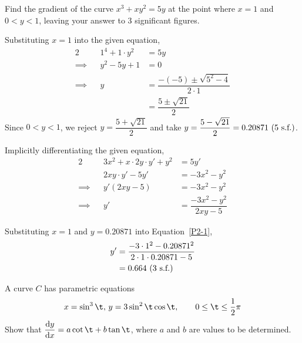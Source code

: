 \documentclass{echw}
\begin{document}
    \problem{}
        Find the gradient of the curve $x^3 + xy^2 = 5y$ at the point where $x=1$ and $0 < y < 1$, leaving your answer to 3 significant figures.

    \solution
        Substituting $x=1$ into the given equation,
        \begin{alignat*}{2}
            &&1^4 + 1\cdot y^2 &= 5y\\
            \implies&&y^2-5y+1&=0\\
            \implies&&y &= \dfrac{-(-5)\pm\sqrt{5^2-4}}{2\cdot1}\\
            && &= \dfrac{5\pm\sqrt{21}}2
        \end{alignat*}
        Since $0 < y < 1$, we reject $y = \dfrac{5+\sqrt{21}}2$ and take $y = \dfrac{5-\sqrt{21}}2 = 0.20871 \text{ (5 s.f.)}$.

        Implicitly differentiating the given equation,
        \begin{alignat}{2}
            &&3x^2+x\cdot2y\cdot y' + y^2 &= 5y' \nonumber\\
            &&2xy\cdot y' - 5y' &= -3x^2-y^2 \nonumber\\
            \implies&&y'(2xy-5)&=-3x^2-y^2 \nonumber\\
            \implies&&y' &= \dfrac{-3x^2-y^2}{2xy-5}\label{P2-1}
        \end{alignat}

        Substituting $x=1$ and $y=0.20871$ into Equation~\ref{P2-1}, 
        \begin{align*}
            y' &= \dfrac{-3\cdot1^2-0.20871^2}{2\cdot 1 \cdot 0.20871-5}\\
            &= 0.664 \text{ (3 s.f.)}
        \end{align*}


    \problem{}
        A curve $C$ has parametric equations
        \[
            x = \sin^3 \t, \, y = 3 \sin^2 \t \cos \t, \qquad 0 \leq \t \leq \dfrac12 \pi
        \]
        Show that $\der{y}{x} = a\cot \t + b\tan \t$, where $a$ and $b$ are values to be determined.
\end{document}
